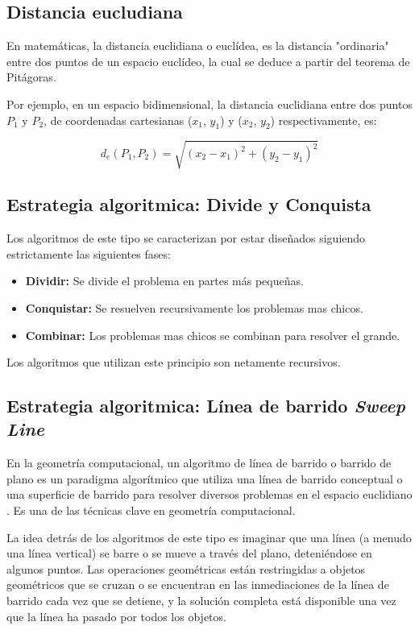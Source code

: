 \subsection{Distancia eucludiana}

En matemáticas, la distancia euclidiana o euclídea, es la distancia "ordinaria" entre dos puntos de un espacio euclídeo, la cual se deduce a partir del teorema de Pitágoras.

Por ejemplo, en un espacio bidimensional, la distancia euclidiana entre dos puntos $P_1$ y $P_2$, de coordenadas cartesianas ($x_1$, $y_1$) y ($x_2$, $y_2$) respectivamente, es: 

$$ d_e (P_1,P_2) = \sqrt{(x_2-x_1)^2 + (y_2-y_1)^2}  $$

\subsection{Estrategia algoritmica: Divide y Conquista}
Los algoritmos de este tipo se caracterizan por estar diseñados siguiendo estrictamente las siguientes fases:
\begin{itemize}
	\item {\bf Dividir:} Se divide el problema en partes más pequeñas.
	\item {\bf Conquistar:} Se resuelven recursivamente los problemas mas chicos. 
	\item {\bf Combinar:} Los problemas mas chicos se combinan para resolver el grande.
\end{itemize} 
Los algoritmos que utilizan este principio son netamente recursivos. 

\subsection{Estrategia algoritmica: Línea de barrido \emph{Sweep Line}}
En la geometría computacional, un algoritmo de línea de barrido o barrido de plano es un paradigma algorítmico que utiliza una línea de barrido conceptual o una superficie de barrido para resolver diversos problemas en el espacio euclidiano . Es una de las técnicas clave en geometría computacional.

La idea detrás de los algoritmos de este tipo es imaginar que una línea (a menudo una línea vertical) se barre o se mueve a través del plano, deteniéndose en algunos puntos. Las operaciones geométricas están restringidas a objetos geométricos que se cruzan o se encuentran en las inmediaciones de la línea de barrido cada vez que se detiene, y la solución completa está disponible una vez que la línea ha pasado por todos los objetos.